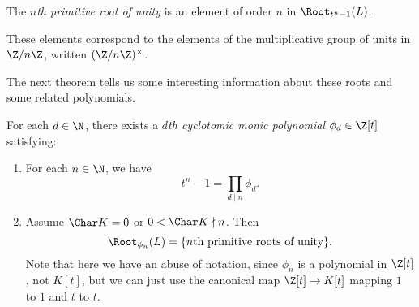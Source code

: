 \documentclass[a4paper]{article}
\begin{document}
\begin{defi}
  The \emph{$n$th primitive root of unity} is an element of order $n$ in $\Root_{t^n - 1}(L)$.
\end{defi}
These elements correspond to the elements of the multiplicative group of units in $\Z/n\Z$, written $(\Z/n\Z)^\times$.

The next theorem tells us some interesting information about these roots and some related polynomials.

\begin{thm}
  For each $d \in \N$, there exists a \emph{$d$th cyclotomic monic polynomial} $\phi_d \in \Z[t]$ satisfying:
  \begin{enumerate}
    \item For each $n \in \N$, we have
      \[
        t^n - 1 = \prod_{d \mid n} \phi_d.
      \]
    \item Assume $\Char K = 0$ or $0 < \Char K \nmid n$. Then
      \[
        \Root_{\phi_n}(L) = \{n\text{th primitive roots of unity}\}.
      \]
      Note that here we have an abuse of notation, since $\phi_n$ is a polynomial in $\Z[t]$, not $K[t]$, but we can just use the canonical map $\Z[t] \to K[t]$ mapping $1$ to $1$ and $t$ to $t$.
  \end{enumerate}
\end{thm}
\end{document}
